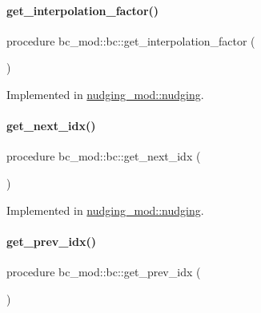 \paragraph{\texorpdfstring{get\+\_\+interpolation\+\_\+factor()}{get\_interpolation\_factor()}}
{\footnotesize\ttfamily procedure bc\+\_\+mod\+::bc\+::get\+\_\+interpolation\+\_\+factor (\begin{DoxyParamCaption}{ }\end{DoxyParamCaption})\hspace{0.3cm}{\ttfamily [private]}}



Implemented in \mbox{\hyperlink{structnudging__mod_1_1nudging_a55ee89e52a1b3b98d4ff84802f888dd4}{nudging\+\_\+mod\+::nudging}}.

\mbox{\label{structbc__mod_1_1bc_abf0c1a16ec610ce08ed379315afc7f55}} 
\paragraph{\texorpdfstring{get\+\_\+next\+\_\+idx()}{get\_next\_idx()}}
{\footnotesize\ttfamily procedure bc\+\_\+mod\+::bc\+::get\+\_\+next\+\_\+idx (\begin{DoxyParamCaption}{ }\end{DoxyParamCaption})\hspace{0.3cm}{\ttfamily [private]}}



Implemented in \mbox{\hyperlink{structnudging__mod_1_1nudging_afd2889fe6e9aa9560ebb2358efba4dec}{nudging\+\_\+mod\+::nudging}}.

\mbox{\label{structbc__mod_1_1bc_aa04b9a462194855b7c9111fe67456f0d}} 
\paragraph{\texorpdfstring{get\+\_\+prev\+\_\+idx()}{get\_prev\_idx()}}
{\footnotesize\ttfamily procedure bc\+\_\+mod\+::bc\+::get\+\_\+prev\+\_\+idx (\begin{DoxyParamCaption}{ }\end{DoxyParamCaption})\hspace{0.3cm}{\ttfamily [private]}}



